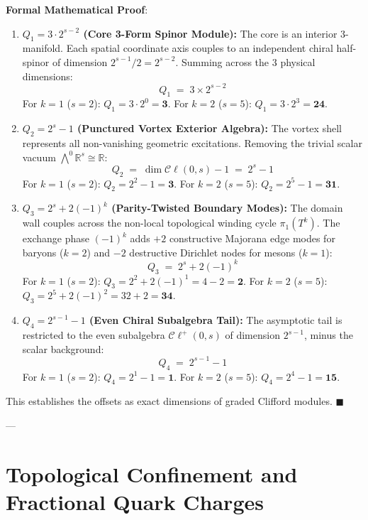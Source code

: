\documentclass[
    12pt,
    a4paper,
    headings=normal,
    twoside=false,
    open=any,
    parskip=half
]{scrbook}
\newenvironment{myproof}[1][]{%
  \par\vspace{6pt}\noindent\textbf{\sffamily\color{maincolor}Formal Mathematical Proof\ifstrempty{#1}{}{ (#1)}}:\par\nopagebreak
}{%
  \penalty50\hfill\ensuremath{\blacksquare}\par\vspace{6pt}
}
\begin{document}
\begin{myproof}
\begin{enumerate}[label=\textbf{(\alph*)}, leftmargin=2em]
    \item \textbf{$Q_1 = 3 \cdot 2^{s-2}$ (Core 3-Form Spinor Module):}  
    The core is an interior 3-manifold. Each spatial coordinate axis couples to an independent chiral half-spinor of dimension $2^{s-1} / 2 = 2^{s-2}$. Summing across the 3 physical dimensions:
    $$Q_1 \;=\; 3 \times 2^{s-2}$$
    For $k = 1$ ($s = 2$): $Q_1 = 3 \cdot 2^0 = \mathbf{3}$.  
    For $k = 2$ ($s = 5$): $Q_1 = 3 \cdot 2^3 = \mathbf{24}$.

    \item \textbf{$Q_2 = 2^s - 1$ (Punctured Vortex Exterior Algebra):}  
    The vortex shell represents all non-vanishing geometric excitations. Removing the trivial scalar vacuum $\bigwedge^0 \mathbb{R}^s \cong \mathbb{R}$:
    $$Q_2 \;=\; \dim \mathcal{C}\ell(0, s) - 1 \;=\; 2^s - 1$$
    For $k = 1$ ($s = 2$): $Q_2 = 2^2 - 1 = \mathbf{3}$.  
    For $k = 2$ ($s = 5$): $Q_2 = 2^5 - 1 = \mathbf{31}$.

    \item \textbf{$Q_3 = 2^s + 2(-1)^k$ (Parity-Twisted Boundary Modes):}  
    The domain wall couples across the non-local topological winding cycle $\pi_1(T^k)$. The exchange phase $(-1)^k$ adds $+2$ constructive Majorana edge modes for baryons ($k = 2$) and $-2$ destructive Dirichlet nodes for mesons ($k = 1$):
    $$Q_3 \;=\; 2^s + 2(-1)^k$$
    For $k = 1$ ($s = 2$): $Q_3 = 2^2 + 2(-1)^1 = 4 - 2 = \mathbf{2}$.  
    For $k = 2$ ($s = 5$): $Q_3 = 2^5 + 2(-1)^2 = 32 + 2 = \mathbf{34}$.

    \item \textbf{$Q_4 = 2^{s-1} - 1$ (Even Chiral Subalgebra Tail):}  
    The asymptotic tail is restricted to the even subalgebra $\mathcal{C}\ell^+(0, s)$ of dimension $2^{s-1}$, minus the scalar background:
    $$Q_4 \;=\; 2^{s-1} - 1$$
    For $k = 1$ ($s = 2$): $Q_4 = 2^1 - 1 = \mathbf{1}$.  
    For $k = 2$ ($s = 5$): $Q_4 = 2^4 - 1 = \mathbf{15}$.
\end{enumerate}
This establishes the offsets as exact dimensions of graded Clifford modules.
\end{myproof}

---

\section{Topological Confinement and Fractional Quark Charges}
\label{sec:ch3_topological_confinement}
\end{document}
